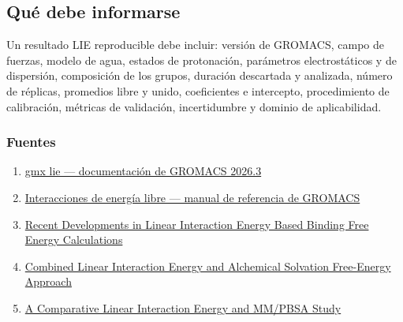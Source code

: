 \documentclass[
  spanish,
  11pt,
  a4paper]{article}
\providecommand{\tightlist}{%
  \setlength{\itemsep}{0pt}\setlength{\parskip}{0pt}}
\begin{document}
\subsection{Qué debe informarse}\label{quuxe9-debe-informarse}

Un resultado LIE reproducible debe incluir: versión de GROMACS, campo de
fuerzas, modelo de agua, estados de protonación, parámetros
electrostáticos y de dispersión, composición de los grupos, duración
descartada y analizada, número de réplicas, promedios libre y unido,
coeficientes e intercepto, procedimiento de calibración, métricas de
validación, incertidumbre y dominio de aplicabilidad.

\subsubsection{Fuentes}\label{fuentes-7}

\begin{enumerate}
\def\labelenumi{\arabic{enumi}.}
\tightlist
\item
  \href{https://manual.gromacs.org/current/onlinehelp/gmx-lie.html}{gmx
  lie --- documentación de GROMACS 2026.3}
\item
  \href{https://manual.gromacs.org/current/reference-manual/functions/free-energy-interactions.html}{Interacciones
  de energía libre --- manual de referencia de GROMACS}
\item
  \href{https://www.frontiersin.org/journals/molecular-biosciences/articles/10.3389/fmolb.2020.00114/full}{Recent
  Developments in Linear Interaction Energy Based Binding Free Energy
  Calculations}
\item
  \href{https://pubs.acs.org/jctcce/article/16/2/1300/606208/Combined-Linear-Interaction-Energy-and-Alchemical}{Combined
  Linear Interaction Energy and Alchemical Solvation Free-Energy
  Approach}
\item
  \href{https://pubs.acs.org/jcisd8/article/59/9/4018/987937/A-Comparative-Linear-Interaction-Energy-and-MM}{A
  Comparative Linear Interaction Energy and MM/PBSA Study}
\end{enumerate}
\end{document}
